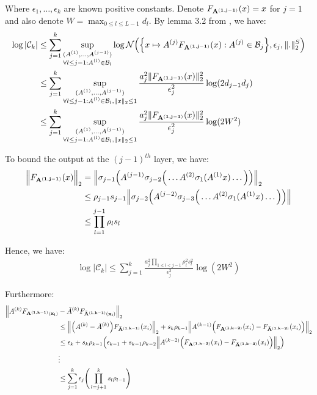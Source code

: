 \noindent Where $\epsilon_1, \dots, \epsilon_k$ are known positive constants. Denote $F_{\bf A^{(1, j-1)}}(x)=x$ for $j=1$ and also denote $W=\max_{0\le l \le L-1}d_l$. By lemma 3.2 from \cite{article:bartlett}, we have:
\begin{align*}
    \log|\mathcal{C}_k| 
    &\le \sum_{j=1}^k\sup_{
        \substack{
            (A^{(1)}, \dots, A^{(j-1)}) \\ \forall l \le j-1: A^{(l)}\in\mathcal{B}_l
        }
    }\log\mathcal{N}\Big( 
        \Big\{ 
            x \mapsto A^{(j)}F_{\bf A^{(1, j-1)}}(x) : A^{(j)} \in \mathcal{B}_j
         \Big\}, \epsilon_j, \|.\|_2^S
     \Big) \\
    &\le \sum_{j=1}^k\sup_{
        \substack{
            (A^{(1)}, \dots, A^{(j-1)}) \\ \forall l \le j-1: A^{(l)}\in\mathcal{B}_l, \|x\|_2 \le 1
        }
    }\frac{a_j^2\|F_{\bf A^{(1, j-1)}}(x)\|_2^2}{\epsilon_j^2}\log(2d_{j-1}d_j) \\
    &\le \sum_{j=1}^k\sup_{
        \substack{
            (A^{(1)}, \dots, A^{(j-1)}) \\ \forall l \le j-1: A^{(l)}\in\mathcal{B}_l, \|x\|_2 \le 1
        }
    }\frac{a_j^2\|F_{\bf A^{(1, j-1)}}(x)\|_2^2}{\epsilon_j^2}\log(2W^2) \\
\end{align*}

\noindent To bound the output at the $(j-1)^{th}$ layer, we have:
\begin{align*}
    \Big\|
        F_{\bf A^{(1, j-1)}}(x)
    \Big\|_2 &= \Big\|
        \sigma_{j-1}\Big( A^{(j-1)}\sigma_{j-2}\Big( \dots A^{(2)}\sigma_1(A^{(1)}x) \dots \Big) \Big)
    \Big\|_2 \\
    &\le \rho_{j-1}s_{j-1} \Big\|
        \sigma_{j-2}\Big( A^{(j-2)}\sigma_{j-3}\Big( \dots A^{(2)}\sigma_1(A^{(1)}x) \dots \Big) \Big)
    \Big\| \\
    &\le \prod_{l=1}^{j-1}\rho_l s_l
\end{align*}

\noindent Hence, we have:
\begin{align*}
    \log|\mathcal{C}_k| \le \sum_{j=1}^k \frac{a_j^2\prod_{1\le l < j-1} \rho_l^2s_l^2}{\epsilon_j^2}\log(2W^2)
\end{align*}

\noindent Furthermore:
\begin{align*}
    \Big\|
        A^{(k)}F_{\bf A^{(1, k-1)}(x_i)} &- {\bar A}^{(k)}F_{\bf {\bar A}^{(1,k-1)}(x_i)} 
    \Big\|_2 \\ &\le \Big\|
        \Big( A^{(k)} - {\bar A}^{(k)} \Big)F_{\bf {\bar A}^{(1, k-1)}}(x_i)
    \Big\|_2 + s_k\rho_{k-1}\Big\|
        A^{(k-1)}\Big( 
            F_{\bf A^{(1, k-2)}}(x_i) - F_{\bf {\bar A}^{(1, k-2)}}(x_i)
         \Big)
    \Big\|_2 \\ 
    &\le \epsilon_k + s_k\rho_{k-1}\Big( \epsilon_{k-1} + s_{k-1}\rho_{k-2}\Big\|
        A^{(k-2)}\Big( 
            F_{\bf A^{(1, k-3)}}(x_i) - F_{\bf {\bar A}^{(1, k-3)}}(x_i)
         \Big)
    \Big\|_2 \Big) \\
    &\vdots \\
    &\le \sum_{j=1}^k\epsilon_j \Bigg( 
        \prod_{l=j+1}^{k} s_{l}\rho_{l-1}
     \Bigg)
\end{align*}

